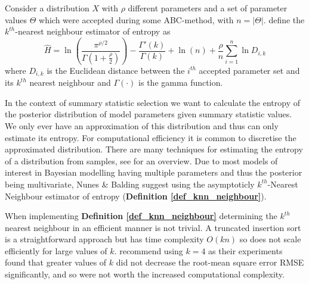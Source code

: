 \documentclass[11pt,a4paper]{article}
\theoremstyle{break}
\begin{document}

  \begin{box_definition}\label{def_knn_neighbour}
    Consider a distribution $X$ with $\rho$ different parameters and a set of parameter values $\Theta$ which were accepted during some ABC-method, with $n=|\Theta|$. \cite{nearest_neighbour_estimates_of_entropy} define the $k^{th}$-nearest neighbour estimator of entropy as
    \[ \hat{H}=\ln\left(\frac{\pi^{\rho/2}}{\Gamma\left(1+\frac\rho2\right)}\right)-\frac{\Gamma'(k)}{\Gamma(k)}+\ln(n)+\frac\rho{n}\sum_{i=1}^n\ln D_{i,k} \]
    where $D_{i,k}$ is the Euclidean distance between the $i^{th}$ accepted parameter set and its $k^{th}$ nearest neighbour and $\Gamma(\cdot)$ is the gamma function.
  \end{box_definition}

  \par In the context of summary statistic selection we want to calculate the entropy of the posterior distribution of model parameters given summary statistic values. We only ever have an approximation of this distribution and thus can only estimate its entropy. For computational efficiency it is common to discretise the approximated distribution. There are many techniques for estimating the entropy of a distribution from samples, see \cite[]{non_parameteric_entropy_estimation} for an overview. Due to most models of interest in Bayesian modelling having multiple parameters and thus the posterior being multivariate, Nunes \& Balding suggest using the asymptoticly $k^{th}$-Nearest Neighbour estimator of entropy \cite{nearest_neighbour_estimates_of_entropy} (\textbf{Definition \ref{def_knn_neighbour}}).

  \par When implementing \textbf{Definition \ref{def_knn_neighbour}} determining the $k^{th}$ nearest neighbour in an efficient manner is not trivial. A truncated insertion sort is a straightforward approach but has time complexity $O(kn)$ so does not scale efficiently for large values of $k$. \cite[]{nearest_neighbour_estimates_of_entropy} recommend using $k=4$ as their experiments found that greater values of $k$ did not decrease the root-mean square error RMSE significantly, and so were not worth the increased computational complexity.
\end{document}
